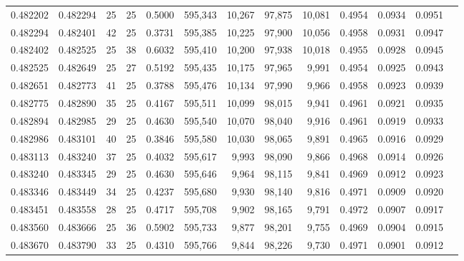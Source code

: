 \begin{tabular}{rrrrrrrrrrrrr}
0.482202 & 0.482294 &    25 &  25 &                                     0.5000 & 595,343 &  10,267 &  97,875 &  10,081 & 0.4954 & 0.0934 & 0.0951 \\
0.482294 & 0.482401 &    42 &  25 &                                     0.3731 & 595,385 &  10,225 &  97,900 &  10,056 & 0.4958 & 0.0931 & 0.0947 \\
0.482402 & 0.482525 &    25 &  38 &                                     0.6032 & 595,410 &  10,200 &  97,938 &  10,018 & 0.4955 & 0.0928 & 0.0945 \\
0.482525 & 0.482649 &    25 &  27 &                                     0.5192 & 595,435 &  10,175 &  97,965 &   9,991 & 0.4954 & 0.0925 & 0.0943 \\
0.482651 & 0.482773 &    41 &  25 &                                     0.3788 & 595,476 &  10,134 &  97,990 &   9,966 & 0.4958 & 0.0923 & 0.0939 \\
0.482775 & 0.482890 &    35 &  25 &                                     0.4167 & 595,511 &  10,099 &  98,015 &   9,941 & 0.4961 & 0.0921 & 0.0935 \\
0.482894 & 0.482985 &    29 &  25 &                                     0.4630 & 595,540 &  10,070 &  98,040 &   9,916 & 0.4961 & 0.0919 & 0.0933 \\
0.482986 & 0.483101 &    40 &  25 &                                     0.3846 & 595,580 &  10,030 &  98,065 &   9,891 & 0.4965 & 0.0916 & 0.0929 \\
0.483113 & 0.483240 &    37 &  25 &                                     0.4032 & 595,617 &   9,993 &  98,090 &   9,866 & 0.4968 & 0.0914 & 0.0926 \\
0.483240 & 0.483345 &    29 &  25 &                                     0.4630 & 595,646 &   9,964 &  98,115 &   9,841 & 0.4969 & 0.0912 & 0.0923 \\
0.483346 & 0.483449 &    34 &  25 &                                     0.4237 & 595,680 &   9,930 &  98,140 &   9,816 & 0.4971 & 0.0909 & 0.0920 \\
0.483451 & 0.483558 &    28 &  25 &                                     0.4717 & 595,708 &   9,902 &  98,165 &   9,791 & 0.4972 & 0.0907 & 0.0917 \\
0.483560 & 0.483666 &    25 &  36 &                                     0.5902 & 595,733 &   9,877 &  98,201 &   9,755 & 0.4969 & 0.0904 & 0.0915 \\
0.483670 & 0.483790 &    33 &  25 &                                     0.4310 & 595,766 &   9,844 &  98,226 &   9,730 & 0.4971 & 0.0901 & 0.0912 \\

\end{tabular}
